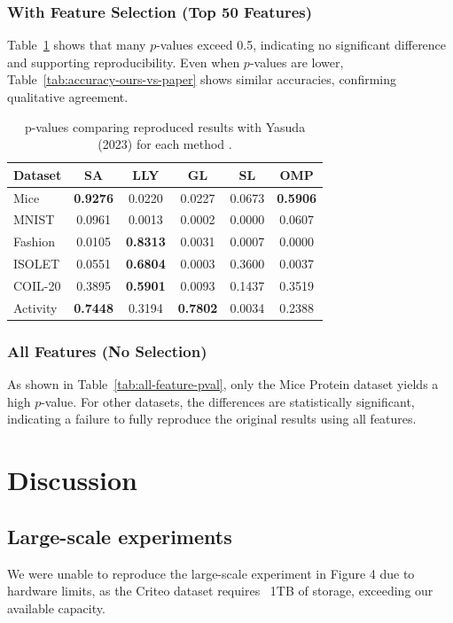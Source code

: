 \documentclass[a4paper,twocolumn]{article} %
\begin{document}
\subsubsection*{With Feature Selection (Top 50 Features)}
Table~\ref{tab:methodwise-pval} shows that many $p$-values exceed 0.5, indicating no significant difference and supporting reproducibility. Even when $p$-values are lower, Table~\ref{tab:accuracy-ours-vs-paper} shows similar accuracies, confirming qualitative agreement.
\begin{table}[ht]
\centering
\scriptsize
\caption{p-values comparing reproduced results with Yasuda (2023) for each method .}
\begin{tabular}{lccccc}
\hline
\textbf{Dataset} & \textbf{SA} & \textbf{LLY} & \textbf{GL} & \textbf{SL} & \textbf{OMP} \\
\hline
Mice     & \textbf{0.9276} & 0.0220 & 0.0227 & 0.0673 & \textbf{0.5906} \\
MNIST    & 0.0961 & 0.0013 & 0.0002 & 0.0000 & 0.0607 \\
Fashion  & 0.0105 & \textbf{0.8313} & 0.0031 & 0.0007 & 0.0000 \\
ISOLET   & 0.0551 & \textbf{0.6804} & 0.0003 & 0.3600 & 0.0037 \\
COIL-20  & 0.3895 & \textbf{0.5901} & 0.0093 & 0.1437 & 0.3519 \\
Activity & \textbf{0.7448} & 0.3194 & \textbf{0.7802} & 0.0034 & 0.2388 \\
\hline
\end{tabular}
\label{tab:methodwise-pval}
\end{table}

\subsubsection*{All Features (No Selection)}
As shown in Table~\ref{tab:all-feature-pval}, only the Mice Protein dataset yields a high $p$-value. For other datasets, the differences are statistically significant, indicating a failure to fully reproduce the original results using all features.

\section{Discussion}


\subsection{ Large-scale experiments}
We were unable to reproduce the large-scale experiment in Figure 4 due to hardware limits, as the Criteo dataset requires ~1TB of storage, exceeding our available capacity.
\end{document}
